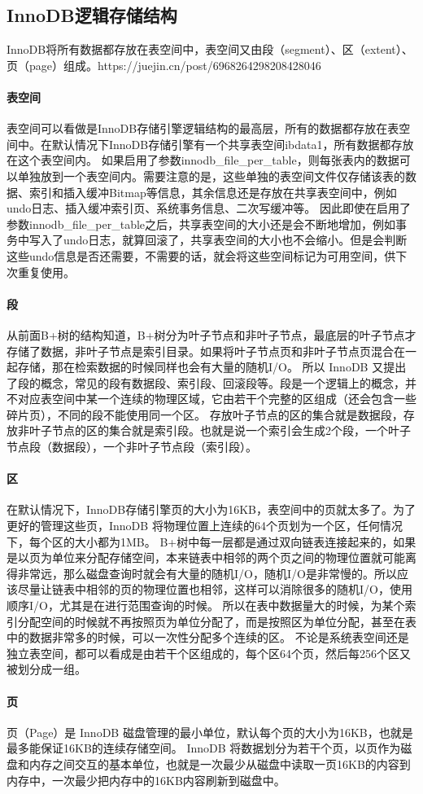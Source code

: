 \documentclass[../../../interview-questions.tex]{subfiles}
\begin{document}
\subsection{InnoDB逻辑存储结构}

InnoDB将所有数据都存放在表空间中，表空间又由段（segment）、区（extent）、页（page）组成。https://juejin.cn/post/6968264298208428046

\paragraph{表空间}

表空间可以看做是InnoDB存储引擎逻辑结构的最高层，所有的数据都存放在表空间中。在默认情况下InnoDB存储引擎有一个共享表空间ibdata1，所有数据都存放在这个表空间内。
如果启用了参数innodb\_file\_per\_table，则每张表内的数据可以单独放到一个表空间内。需要注意的是，这些单独的表空间文件仅存储该表的数据、索引和插入缓冲Bitmap等信息，其余信息还是存放在共享表空间中，例如 undo日志、插入缓冲索引页、系统事务信息、二次写缓冲等。
因此即使在启用了参数innodb\_file\_per\_table之后，共享表空间的大小还是会不断地增加，例如事务中写入了undo日志，就算回滚了，共享表空间的大小也不会缩小。但是会判断这些undo信息是否还需要，不需要的话，就会将这些空间标记为可用空间，供下次重复使用。

\paragraph{段}

从前面B+树的结构知道，B+树分为叶子节点和非叶子节点，最底层的叶子节点才存储了数据，非叶子节点是索引目录。如果将叶子节点页和非叶子节点页混合在一起存储，那在检索数据的时候同样也会有大量的随机I/O。
所以 InnoDB 又提出了段的概念，常见的段有数据段、索引段、回滚段等。段是一个逻辑上的概念，并不对应表空间中某一个连续的物理区域，它由若干个完整的区组成（还会包含一些碎片页），不同的段不能使用同一个区。
存放叶子节点的区的集合就是数据段，存放非叶子节点的区的集合就是索引段。也就是说一个索引会生成2个段，一个叶子节点段（数据段），一个非叶子节点段（索引段）。

\paragraph{区}

在默认情况下，InnoDB存储引擎页的大小为16KB，表空间中的页就太多了。为了更好的管理这些页，InnoDB 将物理位置上连续的64个页划为一个区，任何情况下，每个区的大小都为1MB。
B+树中每一层都是通过双向链表连接起来的，如果是以页为单位来分配存储空间，本来链表中相邻的两个页之间的物理位置就可能离得非常远，那么磁盘查询时就会有大量的随机I/O，随机I/O是非常慢的。所以应该尽量让链表中相邻的页的物理位置也相邻，这样可以消除很多的随机I/O，使用顺序I/O，尤其是在进行范围查询的时候。
所以在表中数据量大的时候，为某个索引分配空间的时候就不再按照页为单位分配了，而是按照区为单位分配，甚至在表中的数据非常多的时候，可以一次性分配多个连续的区。
不论是系统表空间还是独立表空间，都可以看成是由若干个区组成的，每个区64个页，然后每256个区又被划分成一组。

\paragraph{页}

页（Page）是 InnoDB 磁盘管理的最小单位，默认每个页的大小为16KB，也就是最多能保证16KB的连续存储空间。
InnoDB 将数据划分为若干个页，以页作为磁盘和内存之间交互的基本单位，也就是一次最少从磁盘中读取一页16KB的内容到内存中，一次最少把内存中的16KB内容刷新到磁盘中。
\end{document}
